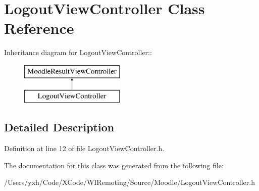 \hypertarget{interface_logout_view_controller}{
\section{LogoutViewController Class Reference}
\label{interface_logout_view_controller}
}
Inheritance diagram for LogoutViewController::\begin{figure}[H]
\begin{center}
\leavevmode
\includegraphics[height=2cm]{interface_logout_view_controller}
\end{center}
\end{figure}


\subsection{Detailed Description}


Definition at line 12 of file LogoutViewController.h.

The documentation for this class was generated from the following file:\begin{DoxyCompactItemize}
\item 
/Users/yxh/Code/XCode/WIRemoting/Source/Moodle/LogoutViewController.h\end{DoxyCompactItemize}
